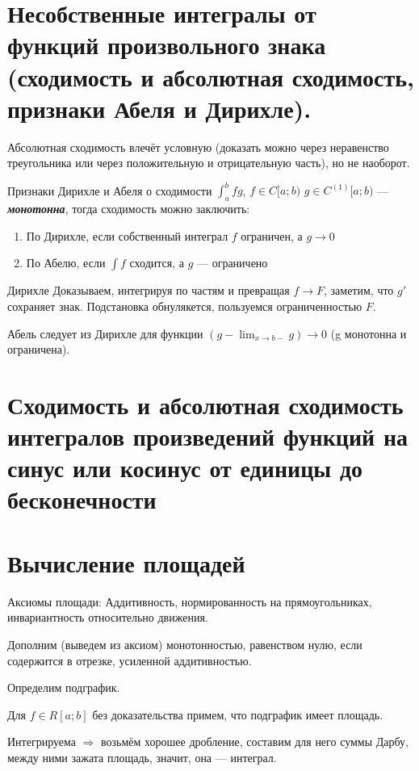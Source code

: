 \documentclass[12pt, a4paper]{article}
\begin{document}
\section{Несобственные интегралы от функций произвольного знака (сходимость и абсолютная сходимость, признаки Абеля и Дирихле).}

    Абсолютная сходимость влечёт условную (доказать можно через неравенство треугольника или через положительную и отрицательную часть), но не наоборот.

    Признаки Дирихле и Абеля о сходимости $\int ^b_a fg$, $f \in C[a; b)$ $g \in C^{(1)}[a; b)$ — \textit{\textbf{монотонна}},
    тогда сходимость можно заключить:

    \begin{enumerate}
        \item По Дирихле, если собственный интеграл $f$ ограничен, а $g → 0$
        \item По Абелю, если $\int f$ сходится, а $g$ — ограничено
    \end{enumerate}

    Дирихле Доказываем, интегрируя по частям и превращая $f → F$, заметим, что $g'$ сохраняет знак.
    Подстановка обнулякется, пользуемся ограниченностью $F$.

    Абель следует из Дирихле для функции $(g - \lim_{x → b-} g) → 0$ (g монотонна и ограничена).

\section{Сходимость и абсолютная сходимость интегралов произведений функций на синус или косинус от единицы до бесконечности}



\section{Вычисление площадей}

    Аксиомы площади: Аддитивность, нормированность на прямоугольниках, инвариантность относительно движения.

    Дополним (выведем из аксиом) монотонностью, равенством нулю, если содержится в отрезке, усиленной аддитивностью.

    Определим подграфик.
    
    Для $f\in R[a; b]$ без доказательства примем, что подграфик имеет площадь.

    Интегрируема $\Rightarrow$ возьмём хорошее дробление, составим для него суммы Дарбу, между ними зажата площадь, значит, она — интеграл.
\end{document}
